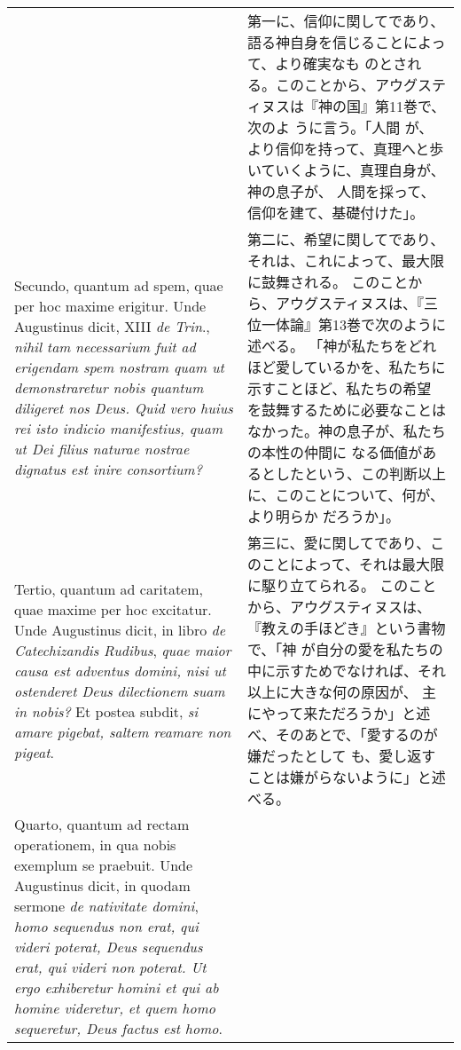 \documentclass[10pt]{jsarticle} %
\begin{document}
\begin{longtable}{p{21em}p{21em}}
&

第一に、信仰に関してであり、語る神自身を信じることによって、より確実なも
 のとされる。このことから、アウグスティヌスは『神の国』第11巻で、次のよ
 うに言う。「人間
 が、より信仰を持って、真理へと歩いていくように、真理自身が、神の息子が、
 人間を採って、信仰を建て、基礎付けた」。


\\

Secundo, quantum ad spem, quae per hoc maxime erigitur. 
Unde
 Augustinus dicit, XIII {\itshape de Trin}., {\itshape nihil tam necessarium fuit ad
 erigendam spem nostram quam ut demonstraretur nobis quantum diligeret
 nos Deus. Quid vero huius rei isto indicio manifestius, quam ut Dei
 filius naturae nostrae dignatus est inire consortium? }


&

第二に、希望に関してであり、それは、これによって、最大限に鼓舞される。
このことから、アウグスティヌスは、『三位一体論』第13巻で次のように述べる。
「神が私たちをどれほど愛しているかを、私たちに示すことほど、私たちの希望
 を鼓舞するために必要なことはなかった。神の息子が、私たちの本性の仲間に
 なる価値があるとしたという、この判断以上に、このことについて、何が、より明らか
 だろうか」。

\\


Tertio, quantum
 ad caritatem, quae maxime per hoc excitatur. Unde Augustinus dicit, in
 libro {\itshape de Catechizandis Rudibus}, {\itshape quae maior causa est adventus domini,
 nisi ut ostenderet Deus dilectionem suam in nobis?} Et postea subdit, {\itshape si
 amare pigebat, saltem reamare non pigeat}. 



&

第三に、愛に関してであり、このことによって、それは最大限に駆り立てられる。
 このことから、アウグスティヌスは、『教えの手ほどき』という書物で、「神
 が自分の愛を私たちの中に示すためでなければ、それ以上に大きな何の原因が、
 主にやって来ただろうか」と述べ、そのあとで、「愛するのが嫌だったとして
 も、愛し返すことは嫌がらないように」と述べる。


\\


Quarto, quantum ad rectam
 operationem, in qua nobis exemplum se praebuit. Unde Augustinus dicit,
 in quodam sermone {\itshape de nativitate domini}, {\itshape homo sequendus non erat, qui
 videri poterat, Deus sequendus erat, qui videri non poterat. Ut ergo
 exhiberetur homini et qui ab homine videretur, et quem homo sequeretur,
 Deus factus est homo}. 



\end{longtable}
\end{document}

